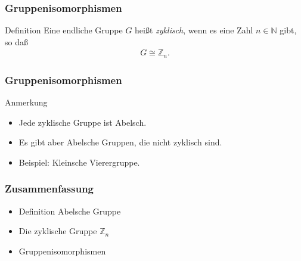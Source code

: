 \documentclass{beamer}
\renewcommand{\emph}[1]{{\textcolor{solarizedRed}{\itshape #1}}}
\newcommand\NN{\mathbb N}
\newcommand\ZZ{\mathbb Z}
\begin{document}
\begin{frame}\frametitle{Gruppenisomorphismen}
	\begin{block}{Definition}
		Eine endliche Gruppe $G$ hei\ss t \emph{zyklisch}, wenn es eine Zahl $n\in\NN$ gibt, so da\ss\
		\begin{align*}
			G\cong \ZZ_n.
		\end{align*}
	\end{block}
\end{frame}

\begin{frame}\frametitle{Gruppenisomorphismen}
	\begin{block}{Anmerkung}
		\begin{itemize}
			\item Jede zyklische Gruppe ist Abelsch.
			\item Es gibt aber Abelsche Gruppen, die nicht zyklisch sind.
			\item Beispiel: Kleinsche Vierergruppe.
		\end{itemize}
	\end{block}
\end{frame}

\begin{frame}\frametitle{Zusammenfassung}
	\begin{itemize}
		\item Definition Abelsche Gruppe
		\item Die zyklische Gruppe $\ZZ_n$
		\item Gruppenisomorphismen
	\end{itemize}
\end{frame}
\end{document}
